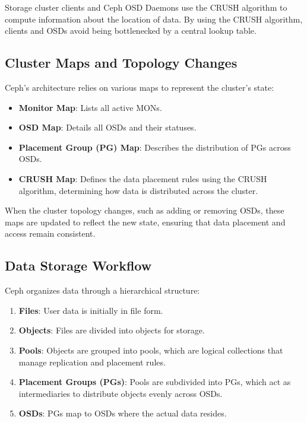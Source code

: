 Storage cluster clients and Ceph OSD Daemons use the CRUSH algorithm to compute information about the location of data. By using the CRUSH algorithm, clients and OSDs avoid being bottlenecked by a central lookup table. \cite{ceph_architecture}

\subsection{Cluster Maps and Topology Changes}

Ceph's architecture relies on various maps to represent the cluster's state:

\begin{itemize}
    \item \textbf{Monitor Map}: Lists all active MONs.
    \item \textbf{OSD Map}: Details all OSDs and their statuses.
    \item \textbf{Placement Group (PG) Map}: Describes the distribution of PGs across OSDs.
    \item \textbf{CRUSH Map}: Defines the data placement rules using the CRUSH algorithm, determining how data is distributed across the cluster.
\end{itemize}

When the cluster topology changes, such as adding or removing OSDs, these maps are updated to reflect the new state, ensuring that data placement and access remain consistent.

\subsection{Data Storage Workflow}

Ceph organizes data through a hierarchical structure:

\begin{enumerate}
    \item \textbf{Files}: User data is initially in file form.
    \item \textbf{Objects}: Files are divided into objects for storage.
    \item \textbf{Pools}: Objects are grouped into pools, which are logical collections that manage replication and placement rules.
    \item \textbf{Placement Groups (PGs)}: Pools are subdivided into PGs, which act as intermediaries to distribute objects evenly across OSDs.
    \item \textbf{OSDs}: PGs map to OSDs where the actual data resides.
\end{enumerate}

